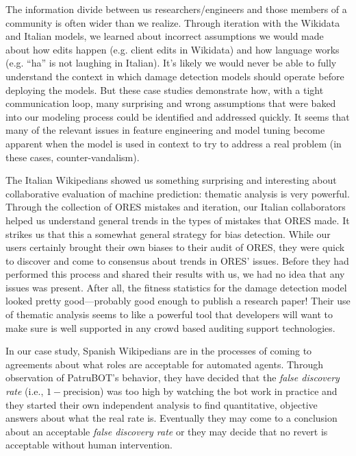 The information divide between us researchers/engineers and those members of a community is often wider than we realize.  Through iteration with the Wikidata and Italian models, we learned about incorrect assumptions we would made about how edits happen (e.g. client edits in Wikidata) and how language works (e.g. ``ha'' is not laughing in Italian).  It's likely we would never be able to fully understand the context in which damage detection models should operate before deploying the models.  But these case studies demonstrate how, with a tight communication loop, many surprising and wrong assumptions that were baked into our modeling process could be identified and addressed quickly.  It seems that many of the relevant issues in feature engineering and model tuning become apparent when the model is used in context to try to address a real problem (in these cases, counter-vandalism).

The Italian Wikipedians showed us something surprising and interesting about collaborative evaluation of machine prediction: thematic analysis is very powerful.  Through the collection of ORES mistakes and iteration, our Italian collaborators helped us understand general trends in the types of mistakes that ORES made.  It strikes us that this a somewhat general strategy for bias detection.  While our users certainly brought their own biases to their audit of ORES, they were quick to discover and come to consensus about trends in ORES' issues.  Before they had performed this process and shared their results with us, we had no idea that any issues was present.  After all, the fitness statistics for the damage detection model looked pretty good---probably good enough to publish a research paper!  Their use of thematic analysis seems to like a powerful tool that developers will want to make sure is well supported in any crowd based auditing support technologies.

In our case study, Spanish Wikipedians are in the processes of coming to agreements about what roles are acceptable for automated agents.  Through observation of PatruBOT's behavior, they have decided that the \emph{false discovery rate} (i.e., $1 - \text{precision}$) was too high by watching the bot work in practice and they started their own independent analysis to find quantitative, objective answers about what the real rate is.  Eventually they may come to a conclusion about an acceptable \emph{false discovery rate} or they may decide that no revert is acceptable without human intervention.
